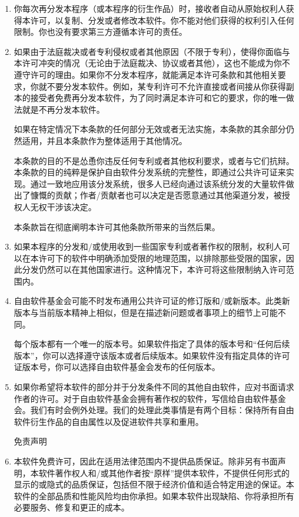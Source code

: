 \documentclass[11pt]{article}
\begin{document}
\begin{enumerate}
\item
你每次再分发本程序（或本程序的衍生作品）时，接收者自动从原始权利人获得本许可，以复制、分发或者修改本软件。你不能对他们获得的权利引入任何限制。你也没有要求第三方遵循本许可的责任。

\item
如果由于法庭裁决或者专利侵权或者其他原因（不限于专利），使得你面临与本许可冲突的情况（无论由于法庭裁决、协议或者其他），这也不能成为你不遵守许可的理由。如果你不分发本程序，就能满足本许可条款和其他相关要求，你就不要分发本软件。例如，某专利许可不允许直接或者间接从你获得副本的接受者免费再分发本软件，为了同时满足本许可和它的要求，你的唯一做法就是不再分发本软件。

如果在特定情况下本条款的任何部分无效或者无法实施，本条款的其余部分仍然适用，并且本条款作为整体适用于其他情况。

本条款的目的不是怂恿你违反任何专利或者其他权利要求，或者与它们抗辩。本条款的目的纯粹是保护自由软件分发系统的完整性，即通过公共许可证来实现。通过一致地应用该分发系统，很多人已经向通过该系统分发的大量软件做出了慷慨的贡献；作者/贡献者也可以决定是否愿意通过其他渠道分发，被授权人无权干涉该决定。

本条款旨在彻底阐明本许可其他条款所带来的当然后果。

\item
如果本程序的分发和/或使用收到一些国家专利或者著作权的限制，权利人可以在本许可下的软件中明确添加受限的地理范围，以排除那些受限的国家，因此分发仍然可以在其他国家进行。这种情况下，本许可将这些限制纳入许可范围内。

\item
自由软件基金会可能不时发布通用公共许可证的修订版和/或新版本。此类新版本与当前版本精神上相似，但是在描述新问题或者事项上的细节上可能不同。

每个版本都有一个唯一的版本号。如果软件指定了具体的版本号和“任何后续版本”，你可以选择遵守该版本或者后续版本。如果软件没有指定具体的许可证版本号，你可以选择自由软件基金会发布的任何版本。

\item
如果你希望将本软件的部分并于分发条件不同的其他自由软件，应对书面请求作者的许可。对于自由软件基金会拥有著作权的软件，写信给自由软件基金会。我们有时会例外处理。我们的处理此类事情是有两个目标：保持所有自由软件衍生作品的自由属性以及促进软件共享和重用。

\begin{center}
{\Large\sc
免责声明
}
\end{center}

\item
{\sc 本软件免费许可，因此在适用法律范围内不提供品质保证。除非另有书面声明，本软件著作权人和/或其他作者按“原样”提供本软件，不提供任何形式的显示的或隐式的品质保证，包括但不限于经济价值和适合特定用途的保证。本软件的全部品质和性能风险均由你承担。如果本软件出现缺陷、你将承担所有必要服务、修复和更正的成本。}


\end{enumerate}
\end{document}
